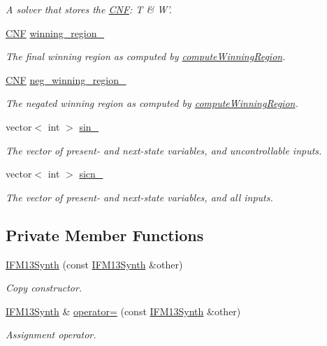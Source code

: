 \begin{DoxyCompactItemize}
\begin{DoxyCompactList}\small\item\em A solver that stores the \hyperlink{classCNF}{C\-N\-F}\-: T \& W'. \end{DoxyCompactList}\item 
\hyperlink{classCNF}{C\-N\-F} \hyperlink{classIFM13Synth_a9b05f84db78c1ac1a2a8f74212f66c64}{winning\-\_\-region\-\_\-}
\begin{DoxyCompactList}\small\item\em The final winning region as computed by \hyperlink{classIFM13Synth_a51c6831265e1daf7d0120c0dd954a0c4}{compute\-Winning\-Region}. \end{DoxyCompactList}\item 
\hyperlink{classCNF}{C\-N\-F} \hyperlink{classIFM13Synth_a334e8e6b638c8c57da3db0c3d161231b}{neg\-\_\-winning\-\_\-region\-\_\-}
\begin{DoxyCompactList}\small\item\em The negated winning region as computed by \hyperlink{classIFM13Synth_a51c6831265e1daf7d0120c0dd954a0c4}{compute\-Winning\-Region}. \end{DoxyCompactList}\item 
vector$<$ int $>$ \hyperlink{classIFM13Synth_ac35a6617ca45b2aa1823c99ae7c984a4}{sin\-\_\-}
\begin{DoxyCompactList}\small\item\em The vector of present-\/ and next-\/state variables, and uncontrollable inputs. \end{DoxyCompactList}\item 
vector$<$ int $>$ \hyperlink{classIFM13Synth_abb5b5fc0fe0db0e7aff06d22547e00bd}{sicn\-\_\-}
\begin{DoxyCompactList}\small\item\em The vector of present-\/ and next-\/state variables, and all inputs. \end{DoxyCompactList}\end{DoxyCompactItemize}
\subsection*{Private Member Functions}
\begin{DoxyCompactItemize}
\item 
\hyperlink{classIFM13Synth_aaa3a0095cffcd56cc6f13ba80362a589}{I\-F\-M13\-Synth} (const \hyperlink{classIFM13Synth}{I\-F\-M13\-Synth} \&other)
\begin{DoxyCompactList}\small\item\em Copy constructor. \end{DoxyCompactList}\item 
\hyperlink{classIFM13Synth}{I\-F\-M13\-Synth} \& \hyperlink{classIFM13Synth_abbce31c761c00c1fca82f93dede10931}{operator=} (const \hyperlink{classIFM13Synth}{I\-F\-M13\-Synth} \&other)
\begin{DoxyCompactList}\small\item\em Assignment operator. \end{DoxyCompactList}\end{DoxyCompactItemize}


